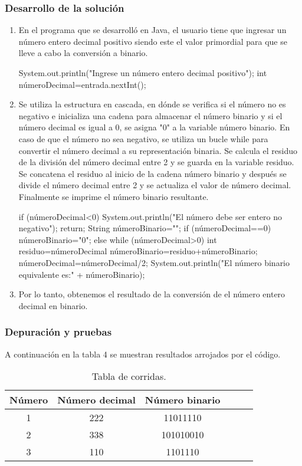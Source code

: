 \subsubsection{Desarrollo de la solución}
\begin{enumerate}
    \item En el programa que se desarrolló en Java, el usuario tiene que ingresar un número entero decimal positivo siendo este el valor primordial para que se lleve a cabo la conversión a binario.
    \begin{javaCode}
        System.out.println("Ingrese un número entero decimal positivo");
        int númeroDecimal=entrada.nextInt();
    \end{javaCode}
    \item Se utiliza la estructura en cascada, en dónde se verifica si el número no es negativo e inicializa una cadena para almacenar el número binario y si el número decimal es igual a 0, se asigna "0" a la variable número binario.
    En caso de que el número no sea negativo, se utiliza un bucle while para convertir el número decimal a su representación binaria. Se calcula el residuo de la división del número decimal entre 2 y se guarda en la variable residuo. Se concatena el residuo al inicio de la cadena número binario y después se divide el número decimal entre 2 y se actualiza el valor de número decimal. Finalmente se imprime el número binario resultante.\\
    \begin{javaCode}
       if (númeroDecimal<0) {
       System.out.println("El número debe ser entero no negativo");
       return;
       }
       String númeroBinario="";
       if (númeroDecimal==0) {
           númeroBinario="0";
        } else {
        while (númeroDecimal>0) {
        int residuo=númeroDecimal%
        númeroBinario=residuo+númeroBinario;
        númeroDecimal=númeroDecimal/2; 
        }
        }
        System.out.println("El número binario equivalente es:" + númeroBinario);
        
    \end{javaCode}
    \item Por lo tanto, obtenemos el resultado de la conversión de el número entero decimal en binario.
\end{enumerate}
\subsubsection{Depuración y pruebas}
A continuación en la tabla 4 se muestran resultados arrojados por el código.
\begin{table}[!ht]
\label{T:equipos}
\begin{center}
\begin{tabular}{| c | c | c | c | c | c |}
\hline
\textbf{Número} & \textbf{Número decimal} & \textbf{Número binario}\\
\hline
1 & 222 & 11011110 \\
2 & 338 & 101010010 \\
3 & 110 & 1101110 \\
\hline
\end{tabular}
\caption{Tabla de corridas.}
\end{center}
\end{table}\\